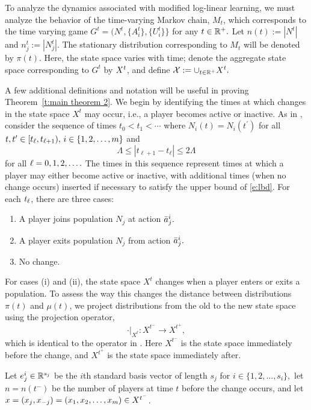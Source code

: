 To analyze the dynamics associated with modified log-linear learning, we must analyze the behavior of the time-varying Markov chain, $M_t$, which corresponds to the time varying game $G^t = (N^t,\{A_i^t\},\{U_i^t\}\}$ for any $t\in \mathbb{R}^+.$ Let $n(t):= |N^t|$ and $n_j^t := |N_j^t|.$ The stationary distribution corresponding to $M_t$ will be denoted by $\pi(t).$ Here, the state space varies with time; denote the aggregate state space corresponding to $G^t$ by $X^t$, and define ${\mathcal X}:=\cup_{t\in \mathbb{R}^+} X^t.$ 

A few additional definitions and notation will be useful in proving Theorem~\ref{t:main theorem 2}. 
We begin by identifying the times at which changes in the state space $X^t$ may occur, i.e., a player becomes active or inactive. As in \cite{Shah2010}, consider the sequence of times
 $t_0<t_1<\cdots$
 where $N_i(t) = N_i(t^\prime)$ for all $t,t^\prime\in [t_{\ell},t_{{\ell}+1}),\, i\in \{1,2,\ldots,m\}$ and 
 \begin{equation}\label{e:lbd}
\Lambda \leq |t_{\ell+1} - t_{\ell}|\leq 2\Lambda
\end{equation}
for all ${\ell} = 0,1,2,\ldots.$ The times in this sequence represent times at which a player may either become active or inactive, with additional times (when no change occurs) inserted if necessary to satisfy the upper bound of \eqref{e:lbd}. For each $t_{\ell}$, there are three cases:
\begin{enumerate}[label=(\roman*)]
\item A player joins population $N_j$ at action $\bar{a}_j^i.$
\item A player exits population $N_j$ from action $\bar{a}_j^i.$
\item No change.
\end{enumerate}
For cases (i) and (ii), the state space $X^t$ changes when a player enters or exits a population. To assess the way this changes the distance between distributions $\pi(t)$ and $\mu(t)$, we project distributions from the old to the new state space using the projection operator, $$\cdot|_{X^t}:X^{t^-}\to X^{t^+},$$ which is identical to the operator in \cite{Shah2010}.  Here $X^{t^-}$ is the state space immediately before the change, and $X^{t^+}$ is the state space immediately after. 


Let $e_j^i\in\mathbb{R}^{s_j}$ be the $i$th standard basis vector of length $s_j$ for $i\in \{1,2,\ldots,s_i\},$   let $n = n(t^-)$ be the number of players at time $t$ before the change occurs, and let $x = (x_{j},x_{{-j}}) = (x_{1},x_{2},\ldots,x_{m})\in X^{t^-} $.

